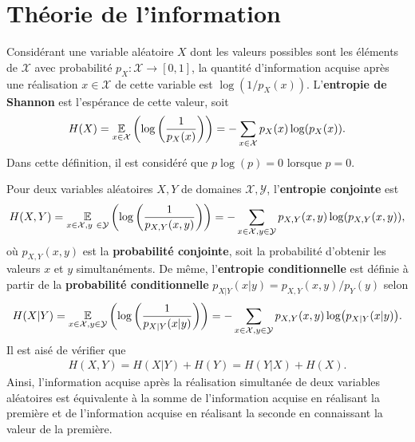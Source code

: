 \begin{comment}
\end{comment}

\appendix

\chapter{Théorie de l'information}
\label{chap:theo_info}

Considérant une variable aléatoire $X$ dont les valeurs possibles sont les éléments de $\mathcal X$
avec probabilité $p_X: \mathcal X \to [0, 1]$,
la quantité d'information acquise après une réalisation $x \in \mathcal X$ de cette variable
est $\log(1/p_X(x))$.
L'\textbf{entropie de Shannon} est l'espérance de cette valeur, soit 
\begin{align}
  H(X) = \operatorname*{\mathbb{E}}_{x \in \mathcal X}\qty(\log\qty(\frac{1}{p_X(x)})) = -\sum_{x\in\mathcal X}p_X(x) \log(p_X (x)).
\end{align}
Dans cette définition,
il est considéré que $p\log(p) = 0$ lorsque $p = 0$.

Pour deux variables aléatoires $X, Y$ de domaines $\mathcal X, \mathcal Y$,
l'\textbf{entropie conjointe} est 
\begin{align}
  H(X, Y) 
  = \expec_{x\in \mathcal X, y \in \mathcal Y}
    \qty(\log\qty(\frac{1}{p_{X,Y}(x, y)})) 
  = -\sum_{x\in\mathcal X, y \in\mathcal Y}p_{X,Y}(x, y) \log(p_{X, Y}(x, y)),
\end{align}
où $p_{X, Y}(x, y)$ est la \textbf{probabilité conjointe},
soit la probabilité d'obtenir les valeurs $x$ et $y$ simultanéments.
De même,
l'\textbf{entropie conditionnelle} est
définie à partir de la \textbf{probabilité conditionnelle} $p_{X | Y}(x | y) = p_{X, Y}(x, y) / p_Y(y)$
selon
\begin{align}
  H(X | Y) 
  = \operatorname*{\mathbb{E}}_{x\in\mathcal X, y \in\mathcal Y}\qty(\log\qty(\frac{1}{p_{X|Y}(x|y)})) 
  = -\sum_{x\in\mathcal X, y \in\mathcal Y}p_{X, Y}(x, y) \log(p_{X|Y}(x|y)).
\end{align}
Il est aisé de vérifier que 
\begin{align}
  H(X, Y) = H(X | Y) + H(Y) = H(Y | X) + H(X).
\end{align}
Ainsi,
l'information acquise après la réalisation simultanée de deux variables aléatoires
est équivalente à la somme de l'information acquise en réalisant la première 
et de l'information acquise en réalisant la seconde en connaissant la valeur de la première.

